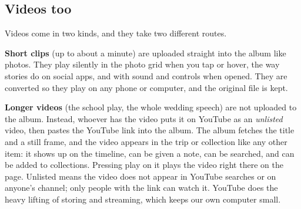 \documentclass[11pt,a4paper]{article}
\begin{document}
\subsection{Videos too}

Videos come in two kinds, and they take two different routes.

\textbf{Short clips} (up to about a minute) are uploaded straight into the album like photos. They play silently in the photo grid when you tap or hover, the way stories do on social apps, and with sound and controls when opened. They are converted so they play on any phone or computer, and the original file is kept.

\textbf{Longer videos} (the school play, the whole wedding speech) are not uploaded to the album. Instead, whoever has the video puts it on YouTube as an \emph{unlisted} video, then pastes the YouTube link into the album. The album fetches the title and a still frame, and the video appears in the trip or collection like any other item: it shows up on the timeline, can be given a note, can be searched, and can be added to collections. Pressing play on it plays the video right there on the page. Unlisted means the video does not appear in YouTube searches or on anyone's channel; only people with the link can watch it. YouTube does the heavy lifting of storing and streaming, which keeps our own computer small.
\end{document}
